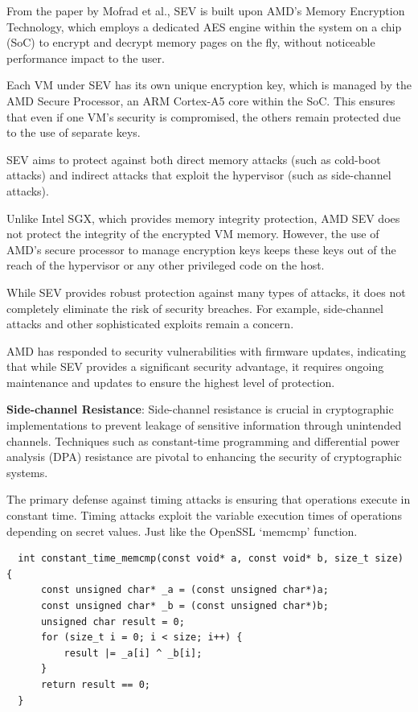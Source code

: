 \begin{itemize}
  From the paper by Mofrad et al.\cite{mofradComparisonStudyIntel2018}, SEV is built upon AMD's Memory Encryption Technology, which employs a dedicated AES engine within the system on a chip (SoC) to encrypt and decrypt memory pages on the fly, without noticeable performance impact to the user.

  Each VM under SEV has its own unique encryption key, which is managed by the AMD Secure Processor, an ARM Cortex-A5 core within the SoC. This ensures that even if one VM’s security is compromised, the others remain protected due to the use of separate keys.

  SEV aims to protect against both direct memory attacks (such as cold-boot attacks) and indirect attacks that exploit the hypervisor (such as side-channel attacks).

  Unlike Intel SGX, which provides memory integrity protection, AMD SEV does not protect the integrity of the encrypted VM memory. However, the use of AMD's secure processor to manage encryption keys keeps these keys out of the reach of the hypervisor or any other privileged code on the host.

  While SEV provides robust protection against many types of attacks, it does not completely eliminate the risk of security breaches. For example, side-channel attacks and other sophisticated exploits remain a concern.

  AMD has responded to security vulnerabilities with firmware updates, indicating that while SEV provides a significant security advantage, it requires ongoing maintenance and updates to ensure the highest level of protection.
\end{itemize}

\textbf{Side-channel Resistance}: Side-channel resistance is crucial in cryptographic implementations to prevent leakage of sensitive information through unintended channels. Techniques such as constant-time programming and differential power analysis (DPA) resistance are pivotal to enhancing the security of cryptographic systems.

The primary defense against timing attacks is ensuring that operations execute in constant time. Timing attacks exploit the variable execution times of operations depending on secret values. Just like the OpenSSL `memcmp' function\cite{DocsMan1Man3}.\\

\begin{verbatim}
  int constant_time_memcmp(const void* a, const void* b, size_t size) {
      const unsigned char* _a = (const unsigned char*)a;
      const unsigned char* _b = (const unsigned char*)b;
      unsigned char result = 0;
      for (size_t i = 0; i < size; i++) {
          result |= _a[i] ^ _b[i];
      }
      return result == 0;
  }
  \end{verbatim}  

